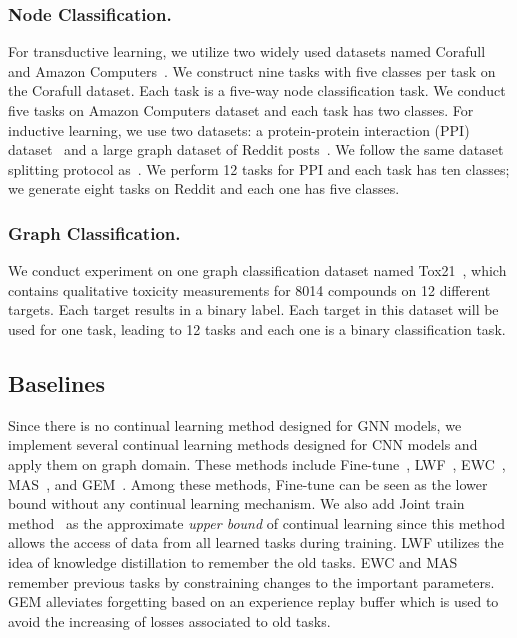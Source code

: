 \documentclass[letterpaper]{article} %
\begin{document}
\subsubsection{Node Classification.}
For transductive learning, we utilize two widely
used datasets named Corafull \cite{bojchevski2017deep} and Amazon Computers~\cite{mcauley2015image}.
We construct nine tasks with five classes per task
on the Corafull dataset.
Each task is a five-way node classification task.
We conduct five tasks on Amazon Computers
dataset and
each task has two classes.
For inductive learning, we use two datasets: a protein-protein interaction (PPI) dataset~\cite{zitnik2017predicting}
and a large graph dataset of
Reddit posts~\cite{hamilton2017inductive}.
We follow the same dataset splitting protocol as~\cite{hamilton2017inductive}.
We perform 12 tasks for PPI and each task has ten classes;
we generate eight tasks on Reddit
and each one has five classes.


\subsubsection{Graph Classification.}
We conduct experiment on one graph classification dataset
named Tox21~\cite{huang2014profiling},
which contains qualitative toxicity measurements
for 8014 compounds on 12 different targets.
Each target results in a binary label.
Each target in this dataset will be used for one task,
leading to 12 tasks and each one is a binary classification task.


\subsection{Baselines}
Since there is no continual learning method designed for GNN models, we implement several continual learning methods designed for CNN models and apply them on graph domain.
These methods include Fine-tune~\cite{girshick2014rich},
LWF~\cite{li2017learning}, EWC~\cite{kirkpatrick2017overcoming},
MAS~\cite{aljundi2018memory}, and GEM~\cite{lopez2017gradient}.
Among these methods, Fine-tune can be seen as the lower bound
without any continual learning mechanism.
We also add Joint train method~\cite{caruana1997multitask}
as the approximate \textit{upper bound} of
continual learning since this method allows the access of data from all learned tasks
during training.
LWF utilizes the idea of knowledge distillation to remember the old tasks.
EWC and MAS remember previous tasks by constraining changes to the important parameters.
GEM alleviates forgetting based on an experience replay buffer
which is used to
avoid the increasing of losses associated to old tasks.
\end{document}
